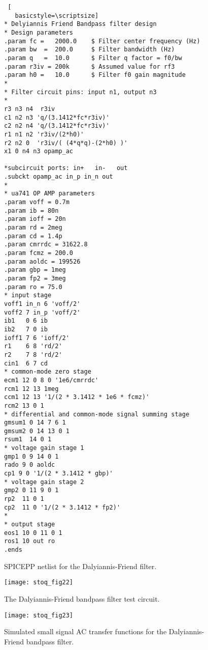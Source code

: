 \begin{figure}
 \begin{lstlisting} [
   basicstyle=\scriptsize]   
* Delyiannis Friend Bandpass filter design
* Design parameters
.param fc =   2000.0    $ Filter center frequency (Hz)
.param bw  =  200.0     $ Filter bandwidth (Hz)
.param q   =  10.0      $ Filter q factor = f0/bw
.param r3iv = 200k      $ Assumed value for rf3
.param h0 =   10.0      $ Filter f0 gain magnitude
*
* Filter circuit pins: input n1, output n3
*
r3 n3 n4  r3iv
c1 n2 n3 'q/(3.1412*fc*r3iv)'
c2 n2 n4 'q/(3.1412*fc*r3iv)'
r1 n1 n2 'r3iv/(2*h0)'
r2 n2 0  'r3iv/( (4*q*q)-(2*h0) )'
x1 0 n4 n3 opamp_ac

*subcircuit ports: in+   in-   out  
.subckt opamp_ac in_p in_n out
*
* ua741 OP AMP parameters
.param voff = 0.7m
.param ib = 80n
.param ioff = 20n
.param rd = 2meg
.param cd = 1.4p 
.param cmrrdc = 31622.8
.param fcmz = 200.0
.param aoldc = 199526
.param gbp = 1meg
.param fp2 = 3meg
.param ro = 75.0
* input stage 
voff1 in_n 6 'voff/2'
voff2 7 in_p 'voff/2'
ib1   0 6 ib
ib2   7 0 ib
ioff1 7 6 'ioff/2'
r1    6 8 'rd/2'
r2    7 8 'rd/2'
cin1  6 7 cd
* common-mode zero stage
ecm1 12 0 8 0 '1e6/cmrrdc'
rcm1 12 13 1meg
ccm1 12 13 '1/(2 * 3.1412 * 1e6 * fcmz)'
rcm2 13 0 1
* differential and common-mode signal summing stage
gmsum1 0 14 7 6 1
gmsum2 0 14 13 0 1
rsum1  14 0 1
* voltage gain stage 1 
gmp1 0 9 14 0 1
rado 9 0 aoldc
cp1 9 0 '1/(2 * 3.1412 * gbp)'
* voltage gain stage 2 
gmp2 0 11 9 0 1
rp2  11 0 1
cp2  11 0 '1/(2 * 3.1412 * fp2)'
*
* output stage 
eos1 10 0 11 0 1
ros1 10 out ro
.ends
\end{lstlisting} 
 \caption{SPICEPP netlist for the Dalyiannis-Friend filter.}
\label{fig:stoq_fig21}
\end{figure}   

\begin{figure}
  \centering
  \texttt{[image: stoq\_fig22]}
  \caption{The Dalyiannis-Friend bandpass filter test circuit.}
  \label{fig:stoq_fig22}
\end{figure} 

\begin{figure}
  \centering
  \texttt{[image: stoq\_fig23]}
  \caption{Simulated small signal AC transfer functions for the Dalyiannis-Friend bandpass filter.}
  \label{fig:stoq_fig23}
\end{figure} 

